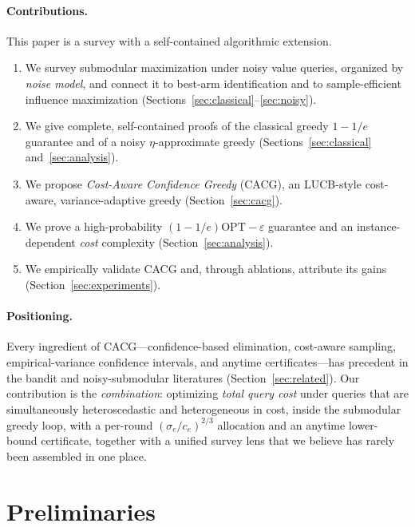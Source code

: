 \documentclass[11pt]{article}
\theoremstyle{plain}
\theoremstyle{definition}
\newcommand{\OPT}{\mathrm{OPT}}
\begin{document}
\paragraph{Contributions.}
This paper is a survey with a self-contained algorithmic extension.
\begin{enumerate}[leftmargin=1.4em,itemsep=1pt]
  \item We survey submodular maximization under noisy value queries,
        organized by \emph{noise model}, and connect it to best-arm
        identification and to sample-efficient influence maximization
        (Sections~\ref{sec:classical}--\ref{sec:noisy}).
  \item We give complete, self-contained proofs of the classical greedy
        $1-1/e$ guarantee and of a noisy $\eta$-approximate greedy
        (Sections~\ref{sec:classical} and~\ref{sec:analysis}).
  \item We propose \emph{Cost-Aware Confidence Greedy} (CACG), an LUCB-style
        cost-aware, variance-adaptive greedy (Section~\ref{sec:cacg}).
  \item We prove a high-probability $(1-1/e)\OPT-\varepsilon$ guarantee and
        an instance-dependent \emph{cost} complexity
        (Section~\ref{sec:analysis}).
  \item We empirically validate CACG and, through ablations, attribute its
        gains (Section~\ref{sec:experiments}).
\end{enumerate}

\paragraph{Positioning.}
{\sloppy
Every ingredient of CACG---confidence-based elimination, cost-aware
sampling, empirical-variance confidence intervals, and anytime
certificates---has precedent in the bandit and noisy-submodular literatures
(Section~\ref{sec:related}). Our contribution is the \emph{combination}:
optimizing \emph{total query cost} under queries that are simultaneously
hetero\-scedastic and hetero\-geneous in cost, inside the submodular greedy
loop, with a per-round $(\sigma_e/c_e)^{2/3}$ allocation and an anytime
lower-bound certificate, together with a unified survey lens that we believe
has rarely been assembled in one place.\par}

\section{Preliminaries}\label{sec:prelim}
\end{document}

